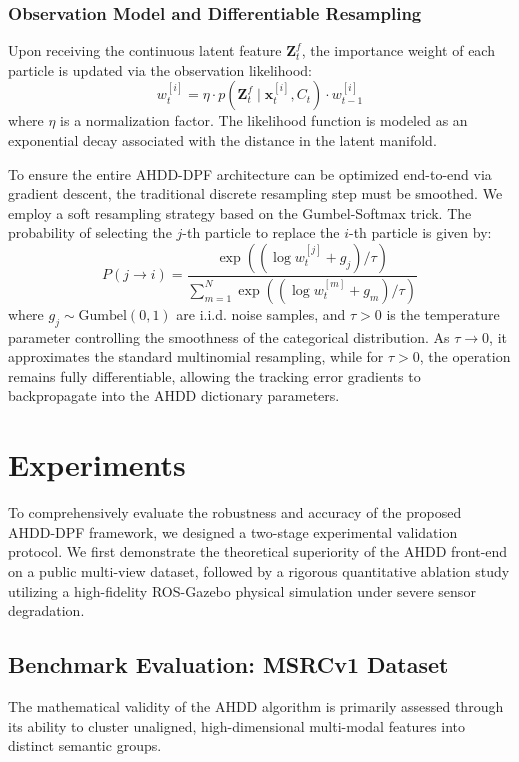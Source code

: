 \documentclass[final,3p,times]{elsarticle}
\begin{document}
\subsubsection{Observation Model and Differentiable Resampling}
Upon receiving the continuous latent feature $\mathbf{Z}^f_t$, the importance weight of each particle is updated via the observation likelihood:
\begin{equation}
    w^{[i]}_t = \eta \cdot p(\mathbf{Z}^f_t \mid \mathbf{x}^{[i]}_t, C_t) \cdot w^{[i]}_{t-1}
\end{equation}
where $\eta$ is a normalization factor. The likelihood function is modeled as an exponential decay associated with the distance in the latent manifold.

To ensure the entire AHDD-DPF architecture can be optimized end-to-end via gradient descent, the traditional discrete resampling step must be smoothed. We employ a soft resampling strategy based on the Gumbel-Softmax trick. The probability of selecting the $j$-th particle to replace the $i$-th particle is given by:
\begin{equation}
    P(j \rightarrow i) = \frac{\exp\left( ( \log w^{[j]}_t + g_j ) / \tau \right)}{\sum_{m=1}^N \exp\left( ( \log w^{[m]}_t + g_m ) / \tau \right)}
\end{equation}
where $g_j \sim \text{Gumbel}(0,1)$ are i.i.d. noise samples, and $\tau > 0$ is the temperature parameter controlling the smoothness of the categorical distribution. As $\tau \to 0$, it approximates the standard multinomial resampling, while for $\tau > 0$, the operation remains fully differentiable, allowing the tracking error gradients to backpropagate into the AHDD dictionary parameters.

\section{Experiments}
\label{sec:experiments}
To comprehensively evaluate the robustness and accuracy of the proposed AHDD-DPF framework, we designed a two-stage experimental validation protocol. We first demonstrate the theoretical superiority of the AHDD front-end on a public multi-view dataset, followed by a rigorous quantitative ablation study utilizing a high-fidelity ROS-Gazebo physical simulation under severe sensor degradation. 

\subsection{Benchmark Evaluation: MSRCv1 Dataset}
\label{subsec:benchmark}
The mathematical validity of the AHDD algorithm is primarily assessed through its ability to cluster unaligned, high-dimensional multi-modal features into distinct semantic groups.
\end{document}
